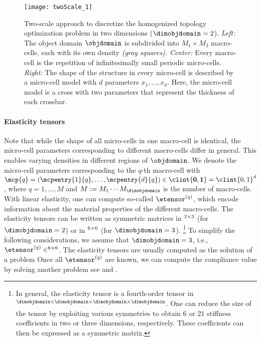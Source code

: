 \begin{figure}
  \texttt{[image: twoScale\_1]}%
  \caption[%
    Two-scale approach for topology optimization%
  ]{%
    Two-scale approach to discretize the homogenized topology
    optimization problem in two dimensions ($\dimobjdomain = 2$).
    \emph{Left:} The object domain $\objdomain$ is
    subdivided into $M_1 \times M_2$ macro-cells,
    each with its own density \emph{(gray squares).}
    \emph{Center:} Every macro-cell is the repetition of infinitesimally small
    periodic micro-cells.
    \emph{Right:} The shape of the structure in every micro-cell is
    described by a micro-cell model with $d$ parameters $x_1, \dotsc, x_d$.
    Here, the micro-cell model is a cross with two parameters
    that represent the thickness of each crossbar.%
  }%
  \label{fig:twoScale}%
\end{figure}

\paragraph{Elasticity tensors}

Note that while the shape of all micro-cells in one macro-cell is identical,
the micro-cell parameters corresponding to different macro-cells differ
in general.
This enables varying densities in different regions of $\objdomain$.
We denote the micro-cell parameters corresponding to the $q$-th macro-cell
with $\mcp{q} = (\mcpentry{1}{q}, \dotsc, \mcpentry{d}{q}) \in
\clint{\*0, \*1} = \clint{0, 1}^d$,
where $q = 1, \dotsc, M$ and
$M := M_1 \dotsm M_{\dimobjdomain}$ is the number of macro-cells.
With linear elasticity,
one can compute so-called  $\etensor^{(q)}$,
which encode information about the material properties
of the different macro-cells.
The elasticity tensors can be written as symmetric matrices
in $\real^{3 \times 3}$ (for $\dimobjdomain = 2$) or
in $\real^{6 \times 6}$ (for $\dimobjdomain = 3$).%
\footnote{%
  In general, the elasticity tensor is a fourth-order tensor in
  $\real^{\dimobjdomain \times \dimobjdomain \times \dimobjdomain \times \dimobjdomain}$.
  One can reduce the size of the tensor by exploiting various symmetries
  \cite{Huebner14Mehrdimensionale}
  to obtain $6$ or $21$ stiffness coefficients
  in two or three dimensions, respectively.
  These coefficients can then be expressed as a symmetric matrix.%
}
To simplify the following considerations,
we assume that $\dimobjdomain = 3$, i.e.,
$\etensor^{(q)} \in \real^{6 \times 6}$.
The elasticity tensors are usually computed as the solution of a \fem problem
Once all $\etensor^{(q)}$ are known,
we can compute the compliance value
by solving another \fem problem 
see \cite{Allaire04Topology} and \cite{Huebner14Mehrdimensionale}.

